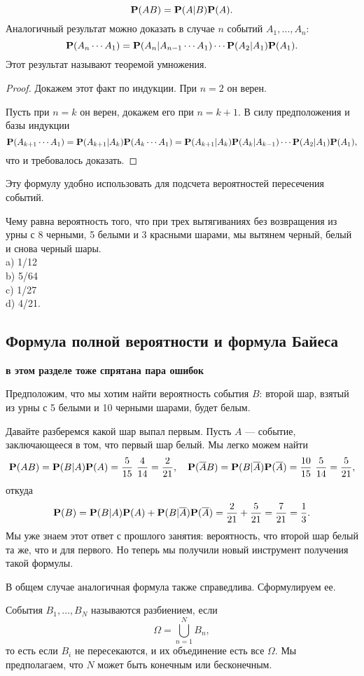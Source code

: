 \documentclass[11 pt,russian]{article}
\begin{document}
$$
{\bf P}(AB) = {\bf P}(A|B) {\bf P}(A).
$$
Аналогичный результат можно доказать в случае $n$ событий $A_1,\dotsc,A_n$:
$$
{\bf P}(A_n \dotsm A_1) = {\bf P}(A_n|A_{n-1}\dotsm A_1) \dotsm {\bf P}(A_2|A_1) {\bf P}(A_1).
$$
Этот результат называют теоремой умножения.
\begin{proof}
Докажем этот факт по индукции. При $n=2$ он верен. 

Пусть при $n=k$ он верен, докажем его при $n=k+1$. В силу предположения и базы индукции
$$
{\bf P}(A_{k+1}\dotsm A_1) = {\bf P}(A_{k+1}|A_k) {\bf P}(A_k \dotsm A_1) = {\bf P}(A_{k+1}|A_k) {\bf P}(A_k|A_{k-1}) \dotsm {\bf P}(A_2|A_1) {\bf P}(A_1),
$$
что и требовалось доказать.
\end{proof}
Эту формулу удобно использовать для подсчета вероятностей пересечения событий.
\begin{Que}
Чему равна вероятность того, что при трех вытягиваниях без возвращения из урны с 8 черными, 5 белыми и 3 красными шарами, мы вытянем черный, белый и снова черный шары.\\
a) 1/12\\
b) 5/64\\
c) 1/27\\
d) 4/21.
\end{Que}
\subsection{Формула полной вероятности и формула Байеса}
{\bf в этом разделе тоже спрятана пара ошибок}
\begin{Exam}
Предположим, что мы хотим найти вероятность события $B$: второй шар, взятый из урны с 5 белыми и 10 черными шарами, будет белым. 

Давайте разберемся какой шар выпал первым. Пусть $A$ --- событие, заключающееся в том, что первый шар белый. Мы легко можем найти
$$
{\bf P}(A B) = {\bf P}(B|A) {\bf P}(A) = \frac{5}{15}\ \frac{4}{14} = \frac{2}{21},\quad {\bf P}(\overline{A} B) = {\bf P}(B|\overline{A}) {\bf P}(\overline{A}) = \frac{10}{15}\ \frac{5}{14} = \frac{5}{21},
$$
откуда 
$$
{\bf P}(B) = {\bf P}(B|A) {\bf P}(A) + {\bf P}(B|\overline{A}) {\bf P}(\overline{A}) = \frac{2}{21} + \frac{5}{21} = \frac{7}{21}=\frac13.
$$
Мы уже знаем этот ответ с прошлого занятия: вероятность, что второй шар белый та же, что и для первого. Но теперь мы получили новый инструмент получения такой формулы.
\end{Exam}
В общем случае аналогичная формула также справедлива. Сформулируем ее.
\begin{Def}
События $B_1,\dotsc,B_N$ называются разбиением, если 
$$\Omega = \bigcup_{n=1}^{N} B_n,$$
то есть если $B_i$ не пересекаются, и их объединение есть все $\Omega$. Мы предполагаем, что $N$ может быть конечным или бесконечным.
\end{Def}
\end{document}
